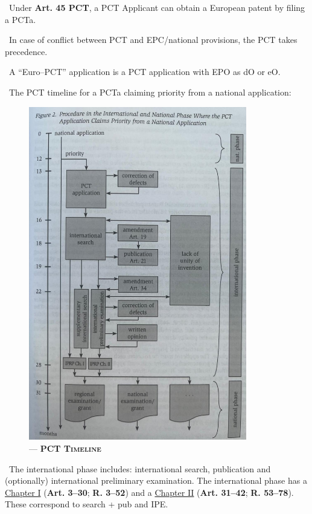 \documentclass{report}
\newcommand{\n}{\newline}
\newcommand{\p}{\adforn{61} \ }
\begin{document}
\p Under \textbf{Art. 45 PCT}, a PCT Applicant can obtain a European patent by filing a PCTa. \n

\p In case of conflict between PCT and EPC/national provisions, the PCT takes precedence. \n

\p A ``Euro--PCT'' application is a PCT application with EPO as dO or eO. \n

\p The PCT timeline for a PCTa claiming priority from a national application: 

\newpage
\begin{figure}[H] %
  \centering
  \includegraphics[width=0.85\textwidth]{images/Fig_2.jpg} %
  \caption{--- \textbf{\textsc{PCT Timeline}}}
\end{figure}




\p The international phase includes: international search, publication and (optionally) international preliminary examination. The international phase has a \underline{Chapter I} (\textbf{Art. 3--30}; \textbf{R. 3--52}) and a \underline{Chapter II} (\textbf{Art. 31--42}; \textbf{R. 53--78}). These correspond to search + pub and IPE. \n
\end{document}
